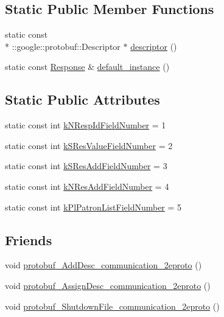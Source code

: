\subsection*{Static Public Member Functions}
\begin{DoxyCompactItemize}
\item 
static const \\*
\-::google\-::protobuf\-::\-Descriptor $\ast$ \hyperlink{classResponse_a6f855359144caf6431388401cd4e4814}{descriptor} ()
\item 
static const \hyperlink{classResponse}{Response} \& \hyperlink{classResponse_a5643ccd57e4ae77abfbd43350563909a}{default\-\_\-instance} ()
\end{DoxyCompactItemize}
\subsection*{Static Public Attributes}
\begin{DoxyCompactItemize}
\item 
static const int \hyperlink{classResponse_a80c9f1716d6f78f2bd6904fb0bae71f5}{k\-N\-Resp\-Id\-Field\-Number} = 1
\item 
static const int \hyperlink{classResponse_aecaa819bd2416d0df97d98a0cc6bdef4}{k\-S\-Res\-Value\-Field\-Number} = 2
\item 
static const int \hyperlink{classResponse_aada2e486130a9b2e5e95702c296108d6}{k\-S\-Res\-Add\-Field\-Number} = 3
\item 
static const int \hyperlink{classResponse_af0abf189616bbb801e96421e7d321165}{k\-N\-Res\-Add\-Field\-Number} = 4
\item 
static const int \hyperlink{classResponse_a12f1b77a36915a62382afe9a64be3662}{k\-Pl\-Patron\-List\-Field\-Number} = 5
\end{DoxyCompactItemize}
\subsection*{Friends}
\begin{DoxyCompactItemize}
\item 
void \hyperlink{classResponse_ab26f4eb3084d1420c1303a79674a1799}{protobuf\-\_\-\-Add\-Desc\-\_\-communication\-\_\-2eproto} ()
\item 
void \hyperlink{classResponse_a15b53451c705d683df794729c854c3bb}{protobuf\-\_\-\-Assign\-Desc\-\_\-communication\-\_\-2eproto} ()
\item 
void \hyperlink{classResponse_ac41cad024c45b3e4b0ffc5e60c9ecd30}{protobuf\-\_\-\-Shutdown\-File\-\_\-communication\-\_\-2eproto} ()
\end{DoxyCompactItemize}


